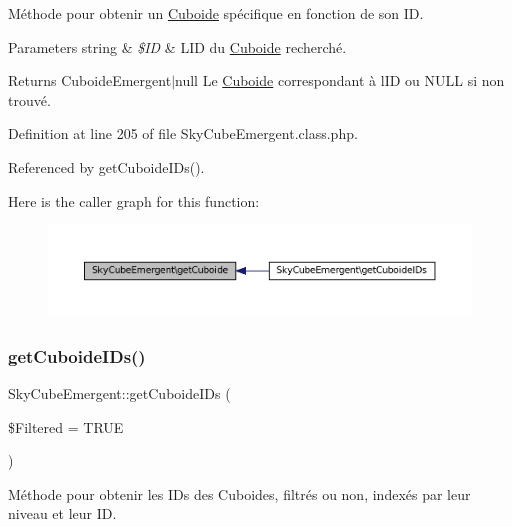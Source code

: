 Méthode pour obtenir un \hyperlink{class_cuboide}{Cuboide} spécifique en fonction de son ID.


\begin{DoxyParams}[1]{Parameters}
string & {\em \$\+ID} & L\textquotesingle{}ID du \hyperlink{class_cuboide}{Cuboide} recherché. \\
\hline
\end{DoxyParams}
\begin{DoxyReturn}{Returns}
Cuboide\+Emergent$\vert$null Le \hyperlink{class_cuboide}{Cuboide} correspondant à l\textquotesingle{}ID ou N\+U\+LL si non trouvé. 
\end{DoxyReturn}


Definition at line 205 of file Sky\+Cube\+Emergent.\+class.\+php.



Referenced by get\+Cuboide\+I\+Ds().

Here is the caller graph for this function\+:\nopagebreak
\begin{figure}[H]
\begin{center}
\leavevmode
\includegraphics[width=350pt]{class_sky_cube_emergent_a4d57d1390c0f7d5fcef3b4d390eaf9dd_icgraph}
\end{center}
\end{figure}
\mbox{\label{class_sky_cube_emergent_ab24162e08074631a59fa8296297ba83f}} 
\subsubsection{\texorpdfstring{get\+Cuboide\+I\+Ds()}{getCuboideIDs()}}
{\footnotesize\ttfamily Sky\+Cube\+Emergent\+::get\+Cuboide\+I\+Ds (\begin{DoxyParamCaption}\item[{}]{\$\+Filtered = {\ttfamily TRUE} }\end{DoxyParamCaption})}

Méthode pour obtenir les I\+Ds des Cuboides, filtrés ou non, indexés par leur niveau et leur ID.


